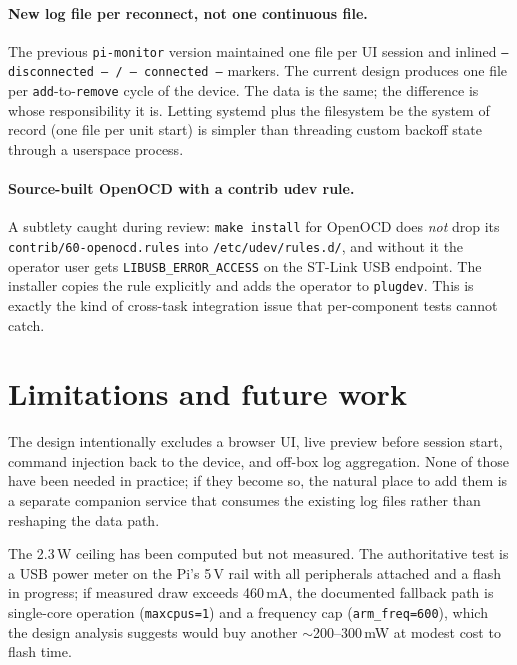 \documentclass[11pt,a4paper]{article}
\begin{document}
\paragraph{New log file per reconnect, not one continuous file.}
The previous \texttt{pi-monitor} version maintained one file per UI
session and inlined \texttt{--- disconnected --- / --- connected ---}
markers. The current design produces one file per
\texttt{add}-to-\texttt{remove} cycle of the device. The data is the
same; the difference is whose responsibility it is. Letting systemd
plus the filesystem be the system of record (one file per unit start)
is simpler than threading custom backoff state through a userspace
process.

\paragraph{Source-built OpenOCD with a contrib udev rule.}
A subtlety caught during review: \texttt{make install} for OpenOCD
does \emph{not} drop its \texttt{contrib/60-openocd.rules} into
\texttt{/etc/udev/rules.d/}, and without it the operator user gets
\texttt{LIBUSB\_ERROR\_ACCESS} on the ST-Link USB endpoint. The
installer copies the rule explicitly and adds the operator to
\texttt{plugdev}. This is exactly the kind of cross-task integration
issue that per-component tests cannot catch.

\section{Limitations and future work}

The design intentionally excludes a browser UI, live preview before
session start, command injection back to the device, and off-box log
aggregation. None of those have been needed in practice; if they
become so, the natural place to add them is a separate companion
service that consumes the existing log files rather than reshaping
the data path.

The 2.3\,W ceiling has been computed but not measured. The
authoritative test is a USB power meter on the Pi's 5\,V rail with
all peripherals attached and a flash in progress; if measured draw
exceeds 460\,mA, the documented fallback path is single-core
operation (\texttt{maxcpus=1}) and a frequency cap
(\texttt{arm\_freq=600}), which the design analysis suggests would
buy another $\sim$200--300\,mW at modest cost to flash time.
\end{document}
